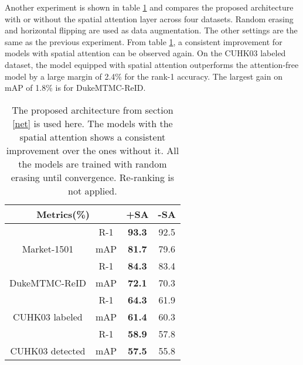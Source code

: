 \documentclass[10pt,twocolumn,letterpaper]{article}
\begin{document}
Another experiment is shown in table \ref{table:sa} and compares the proposed architecture with or without the spatial attention layer across four datasets. Random erasing and horizontal flipping are used as data augmentation. The other settings are the same as the previous experiment. From table \ref{table:sa}, a consistent improvement for models with spatial attention can be observed again. On the CUHK03 labeled dataset, the model equipped with spatial attention outperforms the attention-free model by a large margin of 2.4\% for the rank-1 accuracy. The largest gain on mAP of 1.8\% is for DukeMTMC-ReID.




\begin{table}[!ht]
\begin{center}
\begin{tabular}{c|c|c|c}
\hline \hline
\multicolumn{2}{c|}{{\color[HTML]{333333} Metrics(\%)}} & +SA & -SA \\ \hline
 & R-1 & {\color[HTML]{3166FF} \textbf{93.3}} & 92.5 \\
\multirow{-2}{*}{Market-1501} & mAP & {\color[HTML]{3166FF} \textbf{81.7}} & 79.6 \\ \hline
 & R-1 & {\color[HTML]{3166FF} \textbf{84.3}} & 83.4 \\
\multirow{-2}{*}{DukeMTMC-ReID} & mAP & {\color[HTML]{3166FF} \textbf{72.1}} & 70.3 \\ \hline
 & R-1 & {\color[HTML]{3166FF} \textbf{64.3}} & 61.9 \\
\multirow{-2}{*}{CUHK03 labeled} & mAP & {\color[HTML]{3166FF} \textbf{61.4}} & 60.3 \\ \hline
 & R-1 & {\color[HTML]{3166FF} \textbf{58.9}} & 57.8 \\
\multirow{-2}{*}{CUHK03 detected} & mAP & {\color[HTML]{3166FF} \textbf{57.5}} & 55.8 \\ \hline \hline
\end{tabular}
\end{center}
\caption{The proposed architecture from section \ref{net} is used here. The models with the spatial attention shows a consistent improvement over the ones without it. All the models are trained with random erasing until convergence. Re-ranking is not applied.}
\label{table:sa}
\end{table}
\end{document}
